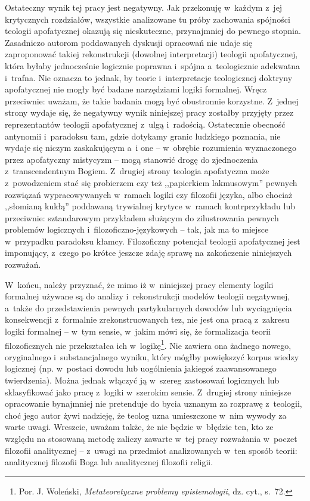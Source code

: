 Ostateczny wynik tej pracy jest negatywny. Jak przekonuję w~każdym z~jej krytycznych rozdziałów, wszystkie analizowane tu próby zachowania spójności teologii apofatycznej okazują się nieskuteczne, przynajmniej do pewnego stopnia. Zasadniczo autorom poddawanych dyskusji opracowań nie udaje się zaproponować takiej rekonstrukcji (dowolnej interpretacji) teologii apofatycznej, która byłaby jednocześnie logicznie poprawna i~spójna a~teologicznie adekwatna i~trafna. Nie oznacza to jednak, by teorie i~interpretacje teologicznej doktryny apofatycznej nie mogły być badane narzędziami logiki formalnej. Wręcz przeciwnie: uważam, że takie badania mogą być obustronnie korzystne. Z~jednej strony wydaje się, że negatywny wynik niniejszej pracy zostałby przyjęty przez reprezentantów teologii apofatycznej z~ulgą i~radością. Ostatecznie obecność antynomii i~paradoksu tam, gdzie dotykamy granic ludzkiego poznania, nie wydaje się niczym zaskakującym a~i one -- w~obrębie rozumienia wyznaczonego przez apofatyczny mistycyzm -- mogą stanowić drogę do zjednoczenia z~transcendentnym Bogiem. Z~drugiej strony teologia apofatyczna może z~powodzeniem stać się probierzem czy też ,,papierkiem lakmusowym'' pewnych rozwiązań wypracowywanych w~ramach logiki czy filozofii języka, albo chociaż ,,słomianą kukłą'' poddawaną trywialnej krytyce w~ramach kontrprzykładu lub przeciwnie: sztandarowym przykładem służącym do zilustrowania pewnych problemów logicznych i~filozoficzno-językowych -- tak, jak ma to miejsce w~przypadku paradoksu kłamcy. Filozoficzny potencjał teologii apofatycznej jest imponujący, z~czego po krótce jeszcze zdaję sprawę na zakończenie niniejszych rozważań.

W~końcu, należy przyznać, że mimo iż w~niniejszej pracy elementy logiki formalnej używane są do analizy i~rekonstrukcji modelów teologii negatywnej, a~także do przedstawienia pewnych partykularnych dowodów lub wyciągnięcia konsekwencji z~formalnie zrekonstruowanych tez, nie jest ona pracą z~zakresu logiki formalnej -- w~tym sensie, w~jakim mówi się, że formalizacja teorii filozoficznych nie przekształca ich w~logikę\footnote{Por. J. Woleński, \textit{Metateoretyczne problemy epistemologii}, dz. cyt., s.~72.}. Nie zawiera ona żadnego nowego, oryginalnego i~substancjalnego wyniku, który mógłby powiększyć korpus wiedzy logicznej (np. w~postaci dowodu lub uogólnienia jakiegoś zaawansowanego twierdzenia). Można jednak włączyć ją w~szereg zastosowań logicznych lub sklasyfikować jako pracę z~logiki w~szerokim sensie. Z~drugiej strony niniejsze opracowanie bynajmniej nie pretenduje  do bycia uznanym za rozprawę z~teologii, choć jego autor żywi nadzieję, że teolog uzna umieszczone w~nim wywody za warte uwagi. Wreszcie, uważam także, że nie będzie w~błędzie ten, kto ze względu na stosowaną metodę zaliczy zawarte w~tej pracy rozważania w~poczet filozofii analitycznej -- z~uwagi na przedmiot analizowanych w~ten sposób teorii: analitycznej filozofii Boga lub analitycznej filozofii religii.


